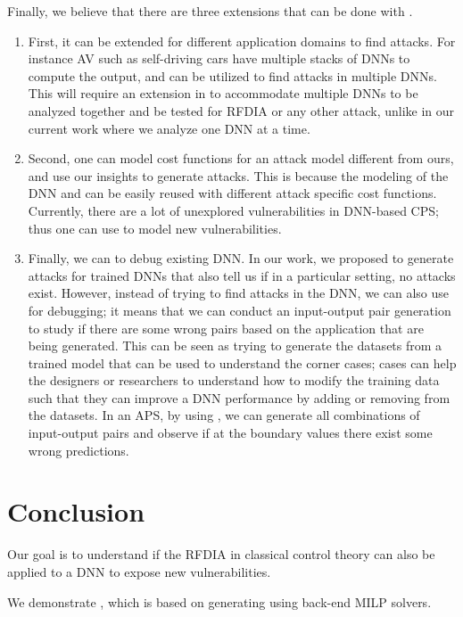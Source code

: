 Finally, we believe that there are three extensions that can be done with \tool. 
\begin{enumerate}
	\item First, it can be extended for different application domains to find attacks.
	For instance \ac{AV} such as self-driving cars have multiple stacks of \ac{DNN}s to compute the output, and \tool can be utilized to find attacks in multiple \ac{DNN}s. 
	This will require an extension in \tool to accommodate multiple \ac{DNN}s to be analyzed together and be tested for \ac{RFDIA} or any other attack, unlike in our current work where we analyze one \ac{DNN} at a time. 
	\item Second, one can model cost functions for an attack model different from ours, and use our insights to generate attacks. 
	This is because the modeling of the \ac{DNN} and \tool can be easily reused with different attack specific cost functions. 
	Currently, there are a lot of unexplored vulnerabilities in \ac{DNN}-based \ac*{CPS}; thus one can use \tool to model new vulnerabilities. 
	\item Finally, we can \tool to debug existing DNN.
	In our work, we proposed \tool to generate attacks for trained \ac{DNN}s that also tell us if in a particular setting, no attacks exist. 
	However, instead of trying to find attacks in the \ac{DNN}, we can also use \tool for debugging; it means that we can conduct an input-output pair generation to study if there are some wrong pairs based on the application that are being generated. 
	This can be seen as trying to generate the datasets from a trained model that can be used to understand the corner cases; cases can help the designers or researchers to understand how to modify the training data such that they can improve a \ac{DNN} performance by adding or removing from the datasets.
	In an \ac{APS}, by using \tool, we can generate all combinations of input-output pairs and observe if at the boundary values there exist some wrong predictions. 
\end{enumerate}


\section{Conclusion}


Our goal is to understand if the  \ac*{RFDIA} in classical control theory can also be applied to a \ac{DNN} to expose new vulnerabilities.

We demonstrate \tool, which is based on generating \attack using back-end \ac{MILP} solvers. 

